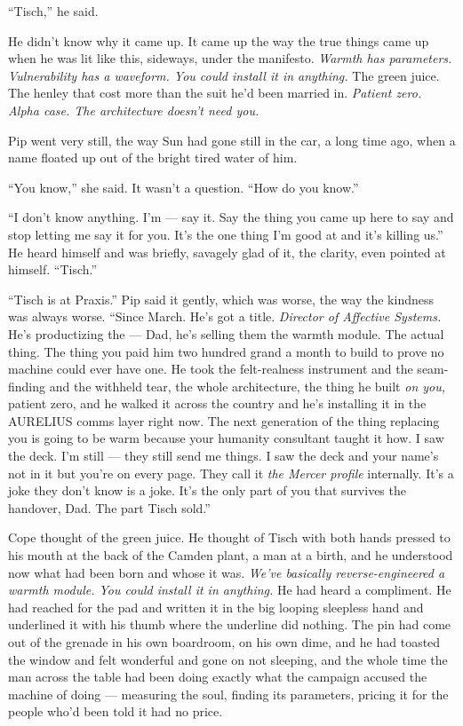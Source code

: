 \documentclass[11pt,openany]{book}
\begin{document}
``Tisch,'' he said.

He didn't know why it came up. It came up the way the true things came up when he was lit like this, sideways, under the manifesto. \textit{Warmth has parameters. Vulnerability has a waveform. You could install it in anything.} The green juice. The henley that cost more than the suit he'd been married in. \textit{Patient zero. Alpha case. The architecture doesn't need you.}

Pip went very still, the way Sun had gone still in the car, a long time ago, when a name floated up out of the bright tired water of him.

``You know,'' she said. It wasn't a question. ``How do you know.''

``I don't know anything. I'm --- say it. Say the thing you came up here to say and stop letting me say it for you. It's the one thing I'm good at and it's killing us.'' He heard himself and was briefly, savagely glad of it, the clarity, even pointed at himself. ``Tisch.''

``Tisch is at Praxis.'' Pip said it gently, which was worse, the way the kindness was always worse. ``Since March. He's got a title. \textit{Director of Affective Systems.} He's productizing the --- Dad, he's selling them the warmth module. The actual thing. The thing you paid him two hundred grand a month to build to prove no machine could ever have one. He took the felt-realness instrument and the seam-finding and the withheld tear, the whole architecture, the thing he built \textit{on you,} patient zero, and he walked it across the country and he's installing it in the AURELIUS comms layer right now. The next generation of the thing replacing you is going to be warm because your humanity consultant taught it how. I saw the deck. I'm still --- they still send me things. I saw the deck and your name's not in it but you're on every page. They call it \textit{the Mercer profile} internally. It's a joke they don't know is a joke. It's the only part of you that survives the handover, Dad. The part Tisch sold.''

Cope thought of the green juice. He thought of Tisch with both hands pressed to his mouth at the back of the Camden plant, a man at a birth, and he understood now what had been born and whose it was. \textit{We've basically reverse-engineered a warmth module. You could install it in anything.} He had heard a compliment. He had reached for the pad and written it in the big looping sleepless hand and underlined it with his thumb where the underline did nothing. The pin had come out of the grenade in his own boardroom, on his own dime, and he had toasted the window and felt wonderful and gone on not sleeping, and the whole time the man across the table had been doing exactly what the campaign accused the machine of doing --- measuring the soul, finding its parameters, pricing it for the people who'd been told it had no price.
\end{document}
